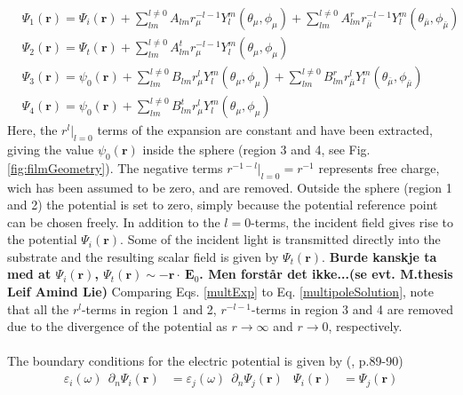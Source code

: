 \begin{subequations}
\label{multExp}
\begin{align}
   &\Psi_1(\boldsymbol{r}) = \Psi_i(\boldsymbol{r}) + \sum\limits_{lm}^{l \neq 0} A_{lm} r_{\mu}^{-l-1} Y_l^m(\theta_{\mu},\phi_{\mu})
   + \sum\limits_{lm}^{l \neq 0} A^r_{lm} r_{\bar{\mu}}^{-l-1} Y_l^m(\theta_{\bar{\mu}},\phi_{\bar{\mu}})
   \label{multExp1}\\
%
   &\Psi_2(\boldsymbol{r}) = \Psi_t(\boldsymbol{r}) + \sum\limits_{lm}^{l \neq 0} A_{lm}^t r_{\mu}^{-l-1} Y_l^m(\theta_{\mu},\phi_{\mu})
   \label{multExp2}\\
%
   &\Psi_3(\boldsymbol{r}) = \psi_0(\boldsymbol{r}) + \sum\limits_{lm}^{l \neq 0} B_{lm} r_{\mu}^l Y_l^m(\theta_{\mu},\phi_{\mu})
   + \sum\limits_{lm}^{l \neq 0} B^r_{lm} r_{\bar{\mu}}^l Y_l^m(\theta_{\bar{\mu}},\phi_{\bar{\mu}})
   \label{multExp3}\\
%
   &\Psi_4(\boldsymbol{r}) = \psi_0(\boldsymbol{r}) + \sum\limits_{lm}^{l \neq 0} B_{lm}^t r_{\mu}^l Y_l^m(\theta_{\mu},\phi_{\mu})
   \label{multExp4}
\end{align}
\end{subequations}
%
Here, the $r^l\big|_{l=0}$ terms of the expansion are constant and have been extracted, 
giving the value $\psi_0(\boldsymbol{r})$ inside the sphere (region 3 and 4, see Fig.\ref{fig:filmGeometry}).
The negative terms $r^{-1-l}\big|_{l=0} = r^{-1}$ represents free charge, wich has been assumed to be
zero, and are removed. 
Outside the sphere (region 1 and 2) the potential is set to zero, 
simply because the potential reference point can be chosen freely. 
In addition to the $l=0$-terms, the incident field gives rise to the potential $\Psi_i(\boldsymbol{r})$. 
Some of the incident light is transmitted directly into the substrate and the resulting scalar field
is given by $\Psi_t(\boldsymbol{r})$.
%
\textbf{Burde kanskje ta med at $\Psi_i(\boldsymbol{r})$, $\Psi_t(\boldsymbol{r}) \sim -\boldsymbol{r}\cdot\
\boldsymbol{E}_0$. Men forstår det ikke...(se evt. M.thesis Leif Amind Lie)}
%
Comparing Eqs. \eqref{multExp} to Eq. \eqref{multipoleSolution}, note that all the
$r^l$-terms in region 1 and 2, $r^{-l-1}$-terms in region 3 and 4 are removed due to the divergence
of the potential as $r \rightarrow \infty$ and $r \rightarrow 0$, respectively.
\\
\\
The boundary conditions for the electric potential is given by (\cite{Griffiths}, p.89-90)
\begin{align}
   \varepsilon\!_i\!(\omega) \:\: \partial_n \Psi_i(\boldsymbol{r}) &= \varepsilon\!_j\!(\omega) \:\:\partial_n \Psi\!_j(\boldsymbol{r})
   &\Psi_i(\boldsymbol{r}) &=\Psi\!_j(\boldsymbol{r})
\end{align}
